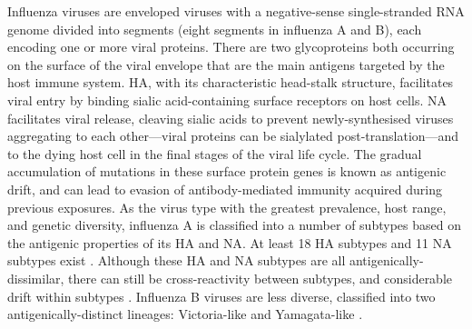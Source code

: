 Influenza viruses are enveloped viruses with a negative-sense single-stranded RNA genome divided into segments (eight segments in influenza A and B), each encoding one or more viral proteins.
There are two glycoproteins both occurring on the surface of the viral envelope that are the main antigens targeted by the host immune system.
\gls{HA}, with its characteristic head-stalk structure, facilitates viral entry by binding sialic acid-containing surface receptors on host cells.
\gls{NA} facilitates viral release, cleaving sialic acids to prevent newly-synthesised viruses aggregating to each other---viral proteins can be sialylated post-translation---and to the dying host cell in the final stages of the viral life cycle.
The gradual accumulation of mutations in these surface protein genes is known as antigenic drift,
and can lead to evasion of antibody-mediated immunity acquired during previous exposures.
As the virus type with the greatest prevalence, host range, and genetic diversity,
influenza A is classified into a number of subtypes based on the antigenic properties of its \gls{HA} and \gls{NA}.
At least 18 \gls{HA} subtypes and 11 \gls{NA} subtypes exist \autocite{krammer2019HumanAntibodyResponse}.
Although these \gls{HA} and \gls{NA} subtypes are all antigenically-dissimilar, 
there can still be cross-reactivity between subtypes, and considerable drift within subtypes \autocite{worldhealthorganization1980RevisionSystemNomenclature}.
%
%
Influenza B viruses are less diverse, classified into two antigenically-distinct lineages: Victoria-like and Yamagata-like \autocite{krammer2018Influenza}.

